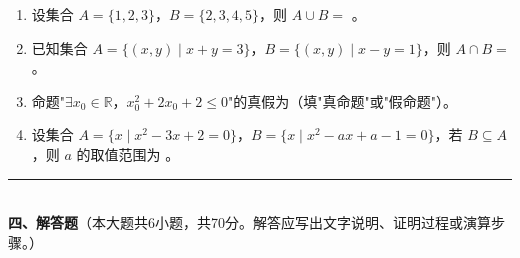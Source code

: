 \documentclass[12pt, a4paper]{ctexart}
\begin{document}
\vspace{6pt}

\begin{enumerate}[resume]
\item 设集合 $A=\{1,2,3\}$，$B=\{2,3,4,5\}$，则 $A\cup B=$ \underline{\hspace{3cm}}。

\item 已知集合 $A=\{(x,y)\mid x+y=3\}$，$B=\{(x,y)\mid x-y=1\}$，则 $A\cap B=$ \underline{\hspace{3cm}}。

\item 命题"$\exists x_0\in\mathbb{R}$，$x_0^2+2x_0+2\leq 0$"的真假为\underline{\hspace{2cm}}（填"真命题"或"假命题"）。

\item 设集合 $A=\{x\mid x^2-3x+2=0\}$，$B=\{x\mid x^2-ax+a-1=0\}$，若 $B\subseteq A$，则 $a$ 的取值范围为 \underline{\hspace{3cm}}。
\end{enumerate}

\vspace{6pt}

\noindent\rule{\textwidth}{0.4pt}\\[2pt]
{\large\bfseries 四、解答题}（本大题共6小题，共70分。解答应写出文字说明、证明过程或演算步骤。）

\vspace{6pt}
\end{document}

